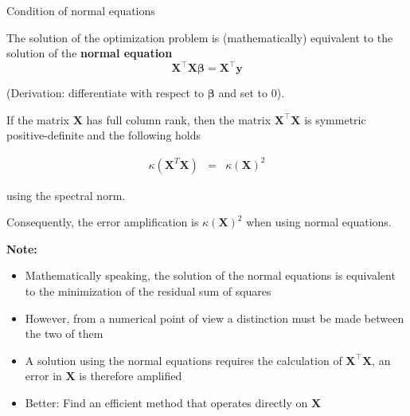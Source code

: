 \begin{vbframe}{Condition of normal equations}

The solution of the optimization problem is (mathematically) equivalent to the solution of the \textbf{normal equation}
$$
\mathbf{X}^\top\mathbf{X}\boldsymbol{\beta} = \mathbf{X}^\top\mathbf{y}
$$

(Derivation: differentiate with respect to $\boldsymbol{\beta}$ and set to $0$).

If the matrix $\mathbf{X}$ has full column rank, then the matrix $\mathbf{X}^\top \mathbf{X}$ is symmetric positive-definite and the following holds

\begin{eqnarray*}
\kappa(\mathbf{X}^T\mathbf{X}) &=& \kappa(\mathbf{X})^2
\end{eqnarray*}

using the spectral norm.

\lz

Consequently, the error amplification is $\kappa(\mathbf{X})^2$ when using normal equations.

\framebreak

\textbf{Note:}
\begin{itemize}
\item Mathematically speaking, the solution of the normal equations is equivalent to the minimization of the residual sum of squares
\item However, from a numerical point of view a distinction must be made between the two of them
\item A solution using the normal equations requires the calculation of $\mathbf{X}^\top \mathbf{X}$, an error in $\mathbf{X}$ is therefore amplified
\item Better: Find an efficient method that operates directly on $\mathbf{X}$
\end{itemize}





\end{vbframe}
